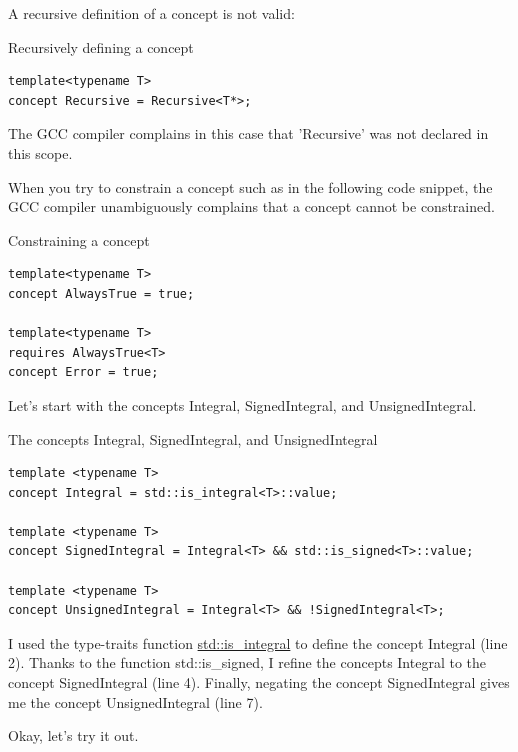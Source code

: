 \begin{tcolorbox}[colback=red!5!white,colframe=red!75!black,title=Don’t define Concepts Recursively or try to Constrain them]
A recursive definition of a concept is not valid:
	
\noindent
Recursively defining a concept
\begin{lstlisting}[style=styleCXX]
template<typename T>
concept Recursive = Recursive<T*>;
\end{lstlisting}
	
The GCC compiler complains in this case that 'Recursive' was not declared in this scope.

When you try to constrain a concept such as in the following code snippet, the GCC compiler unambiguously complains that a concept cannot be constrained.
	
\noindent
Constraining a concept
\begin{lstlisting}[style=styleCXX]
template<typename T>
concept AlwaysTrue = true;

template<typename T>
requires AlwaysTrue<T>
concept Error = true;
\end{lstlisting}

\end{tcolorbox}

Let’s start with the concepts Integral, SignedIntegral, and UnsignedIntegral.

\noindent
The concepts Integral, SignedIntegral, and UnsignedIntegral
\begin{lstlisting}[style=styleCXX]
template <typename T>
concept Integral = std::is_integral<T>::value;

template <typename T>
concept SignedIntegral = Integral<T> && std::is_signed<T>::value;

template <typename T>
concept UnsignedIntegral = Integral<T> && !SignedIntegral<T>;
\end{lstlisting}

I used the type-traits function \href{https://en.cppreference.com/w/cpp/types/is_integral}{std::is\_integral} to define the concept Integral (line 2). Thanks to the function std::is\_signed, I refine the concepts Integral to the concept SignedIntegral (line 4). Finally, negating the concept SignedIntegral gives me the concept UnsignedIntegral (line 7).

Okay, let’s try it out.


